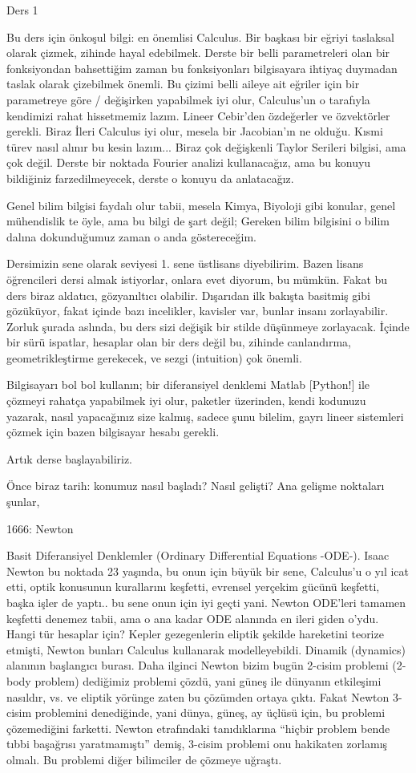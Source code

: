 \documentclass[12pt,fleqn]{article}\usepackage{../../common}
\begin{document}
Ders 1

Bu ders için önkoşul bilgi: en önemlisi Calculus. Bir başkası bir eğriyi
taslaksal olarak çizmek, zihinde hayal edebilmek. Derste bir belli parametreleri
olan bir fonksiyondan bahsettiğim zaman bu fonksiyonları bilgisayara ihtiyaç
duymadan taslak olarak çizebilmek önemli. Bu çizimi belli aileye ait eğriler
için bir parametreye göre / değişirken yapabilmek iyi olur, Calculus'un o
tarafıyla kendimizi rahat hissetmemiz lazım. Lineer Cebir'den özdeğerler ve
özvektörler gerekli. Biraz İleri Calculus iyi olur, mesela bir Jacobian'ın ne
olduğu. Kısmi türev nasıl alınır bu kesin lazım... Biraz çok değişkenli Taylor
Serileri bilgisi, ama çok değil. Derste bir noktada Fourier analizi
kullanacağız, ama bu konuyu bildiğiniz farzedilmeyecek, derste o konuyu da
anlatacağız.

Genel bilim bilgisi faydalı olur tabii, mesela Kimya, Biyoloji gibi
konular, genel mühendislik te öyle, ama bu bilgi de şart değil; Gereken
bilim bilgisini o bilim dalına dokunduğumuz zaman o anda göstereceğim. 

Dersimizin sene olarak seviyesi 1. sene üstlisans diyebilirim. Bazen lisans
öğrencileri dersi almak istiyorlar, onlara evet diyorum, bu mümkün. Fakat
bu ders biraz aldatıcı, gözyanıltıcı olabilir. Dışarıdan ilk bakışta
basitmiş gibi gözüküyor, fakat içinde bazı incelikler, kavisler var, bunlar
insanı zorlayabilir. Zorluk şurada aslında, bu ders sizi değişik bir stilde
düşünmeye zorlayacak. İçinde bir sürü ispatlar, hesaplar olan bir ders
değil bu, zihinde canlandırma, geometrikleştirme gerekecek, ve sezgi
(intuition) çok önemli.

Bilgisayarı bol bol kullanın; bir diferansiyel denklemi Matlab [Python!]  ile
çözmeyi rahatça yapabilmek iyi olur, paketler üzerinden, kendi kodunuzu yazarak,
nasıl yapacağınız size kalmış, sadece şunu bilelim, gayrı lineer sistemleri
çözmek için bazen bilgisayar hesabı gerekli.

Artık derse başlayabiliriz. 

Önce biraz tarih: konumuz nasıl başladı? Nasıl gelişti? Ana gelişme
noktaları şunlar, 

1666: Newton

Basit Diferansiyel Denklemler (Ordinary Differential Equations
-ODE-). Isaac Newton bu noktada 23 yaşında, bu onun için büyük bir sene,
Calculus'u o yıl icat etti, optik konusunun kurallarını keşfetti, evrensel
yerçekim gücünü keşfetti, başka işler de yaptı.. bu sene onun için iyi
geçti yani. Newton ODE'leri tamamen keşfetti denemez tabii, ama o ana kadar
ODE alanında en ileri giden o'ydu. Hangi tür hesaplar için? Kepler
gezegenlerin eliptik şekilde hareketini teorize etmişti, Newton bunları
Calculus kullanarak modelleyebildi. Dinamik (dynamics) alanının başlangıcı
burası. Daha ilginci Newton bizim bugün 2-cisim problemi (2-body problem)
dediğimiz problemi çözdü, yani güneş ile dünyanın etkileşimi nasıldır,
vs. ve eliptik yörünge zaten bu çözümden ortaya çıktı. Fakat Newton 3-cisim
problemini denediğinde, yani dünya, güneş, ay üçlüsü için, bu problemi
çözemediğini farketti. Newton etrafındaki tanıdıklarına ``hiçbir problem
bende tıbbi başağrısı yaratmamıştı'' demiş, 3-cisim problemi onu hakikaten
zorlamış olmalı. Bu problemi diğer bilimciler de çözmeye uğraştı. 
\end{document}

